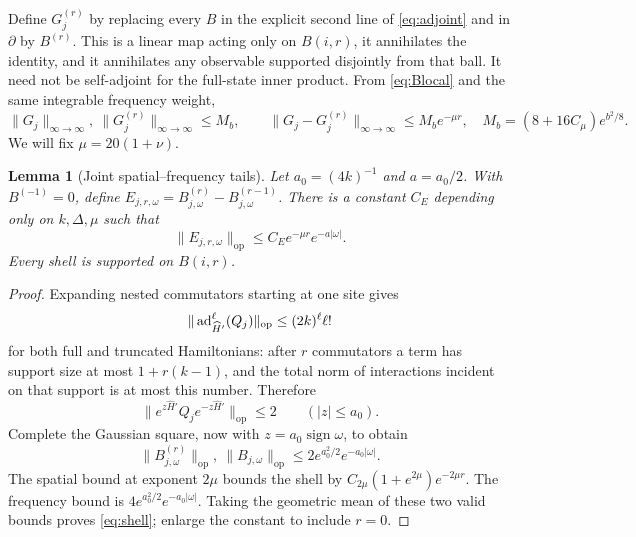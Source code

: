 \documentclass[11pt]{article}
\newtheorem{lemma}[theorem]{Lemma}
\theoremstyle{remark}\newtheorem{remark}[theorem]{Remark}
\newcommand{\op}[1]{\|#1\|_{\mathrm{op}}}
\begin{document}
Define $G_j^{(r)}$ by replacing every $B$ in the explicit second line of \eqref{eq:adjoint} and in $\partial$ by $B^{(r)}$. This is a linear map acting only on $B(i,r)$, it annihilates the identity, and it annihilates any observable supported disjointly from that ball. It need not be self-adjoint for the full-state inner product. From \eqref{eq:Blocal} and the same integrable frequency weight,
\begin{equation}\label{eq:Glocal}
 \|G_j\|_{\infty\to\infty},\ \|G_j^{(r)}\|_{\infty\to\infty}\le M_b,
 \qquad \|G_j-G_j^{(r)}\|_{\infty\to\infty}\le M_b e^{-\mu r},
 \quad M_b=(8+16C_\mu)e^{b^2/8}.
\end{equation}
We will fix $\mu=20(1+\nu)$.

\begin{lemma}[Joint spatial--frequency tails]\label{lem:joint}
Let $a_0=(4k)^{-1}$ and $a=a_0/2$. With $B^{(-1)}=0$, define $E_{j,r,\omega}=B_{j,\omega}^{(r)}-B_{j,\omega}^{(r-1)}$. There is a constant $C_E$ depending only on $k,\Delta,\mu$ such that
\begin{equation}\label{eq:shell}
 \op{E_{j,r,\omega}}\le C_E e^{-\mu r}e^{-a|\omega|}.
\end{equation}
Every shell is supported on $B(i,r)$.
\end{lemma}
\begin{proof}
Expanding nested commutators starting at one site gives
\[
 \op{\ad_{\widehat H'}^{\ell}(Q_j)}\le (2k)^\ell\ell!
\]
for both full and truncated Hamiltonians: after $r$ commutators a term has support size at most $1+r(k-1)$, and the total norm of interactions incident on that support is at most this number. Therefore
\[
 \op{e^{z\widehat H'}Q_je^{-z\widehat H'}}\le2\qquad(|z|\le a_0).
\]
Complete the Gaussian square, now with $z=a_0\operatorname{sign}\omega$, to obtain
\begin{equation}\label{eq:frequency}
 \op{B_{j,\omega}^{(r)}},\ \op{B_{j,\omega}}
 \le2e^{a_0^2/2}e^{-a_0|\omega|}.
\end{equation}
The spatial bound at exponent $2\mu$ bounds the shell by $C_{2\mu}(1+e^{2\mu})e^{-2\mu r}$. The frequency bound is $4e^{a_0^2/2}e^{-a_0|\omega|}$. Taking the geometric mean of these two valid bounds proves \eqref{eq:shell}; enlarge the constant to include $r=0$.
\end{proof}
\end{document}
